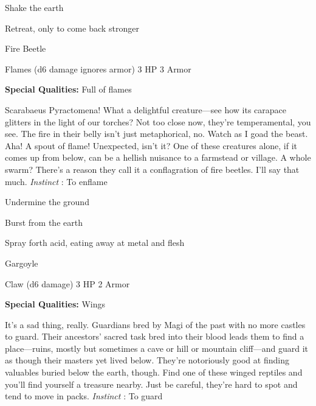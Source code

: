 \startitemize[1,packed]
         
\item Shake the earth

         
\item Retreat, only to come back stronger

       
\stopitemize
       
\startMonsterName
Fire Beetle	 
\stopMonsterName
       

Flames (d6 damage ignores armor)	3 HP	3 Armor

       


       
\startMonsterQualities
         {\bf Special Qualities:}  Full of flames
\stopMonsterQualities
       
\startMonsterDescription
Scarabaeus Pyractomena! What a delightful creature—see how its carapace glitters in the light of our torches? Not too close now, they’re temperamental, you see. The fire in their belly isn’t just metaphorical, no. Watch as I goad the beast. Aha! A spout of flame! Unexpected, isn’t it? One of these creatures alone, if it comes up from below, can be a hellish nuisance to a farmstead or village. A whole swarm? There’s a reason they call it a conflagration of fire beetles. I’ll say that much. {\em Instinct} : To enflame
\stopMonsterDescription
       
\startitemize[1,packed]
         
\item Undermine the ground

         
\item Burst from the earth

         
\item Spray forth acid, eating away at metal and flesh

       
\stopitemize
       
\startMonsterName
Gargoyle	 
\stopMonsterName
       

Claw (d6 damage)	3 HP	2 Armor

       


       
\startMonsterQualities
         {\bf Special Qualities:}  Wings
\stopMonsterQualities
       
\startMonsterDescription
It’s a sad thing, really. Guardians bred by Magi of the past with no more castles to guard. Their ancestors’ sacred task bred into their blood leads them to find a place—ruins, mostly but sometimes a cave or hill or mountain cliff—and guard it as though their masters yet lived below. They’re notoriously good at finding valuables buried below the earth, though. Find one of these winged reptiles and you’ll find yourself a treasure nearby. Just be careful, they’re hard to spot and tend to move in packs. {\em Instinct} : To guard
\stopMonsterDescription
       
